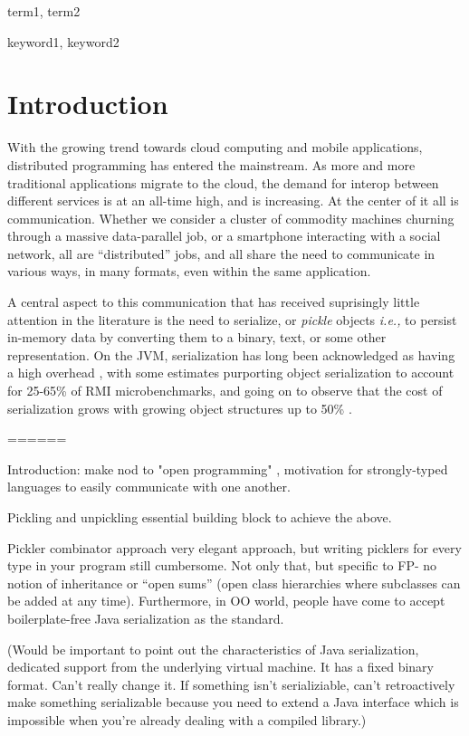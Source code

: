 \documentclass[preprint,10pt]{sigplanconf}
\begin{document}

\terms
term1, term2

\keywords
keyword1, keyword2

\section{Introduction}

With the growing trend towards cloud computing and mobile applications,
distributed programming has entered the mainstream. As more and more
traditional applications migrate to the cloud, the demand for interop between
different services is at an all-time high, and is increasing. At the center of
it all is communication. Whether we consider a cluster of commodity machines
churning through a massive data-parallel job, or a smartphone interacting with
a social network, all are ``distributed'' jobs, and all share the need to
communicate in various ways, in many formats, even within the same
application.

A central aspect to this communication that has received suprisingly little
attention in the literature is the need to serialize, or {\em pickle} objects
{\em i.e.,} to persist in-memory data by converting them to a binary, text, or
some other representation. On the JVM, serialization has long been
acknowledged as having a high overhead \cite{Welsh2000, Carpenter1999}, with
some estimates purporting object serialization to account for 25-65\% of RMI
microbenchmarks, and going on to observe that the cost of serialization grows
with growing object structures up to 50\% \cite{Philippsen2000, Maassen1999}.


======

Introduction: make nod to "open programming" \cite{Rossberg2007}, motivation for strongly-typed languages to easily communicate with one another.

Pickling and unpickling essential building block to achieve the above.

Pickler combinator approach \cite{Kennedy2004} very elegant approach, but writing picklers for every type in your program still cumbersome. Not only that, but specific to FP- no notion of inheritance or ``open sums'' (open class hierarchies where subclasses can be added at any time). Furthermore, in OO world, people have come to accept boilerplate-free Java serialization as the standard.

(Would be important to point out the characteristics of Java serialization, dedicated support from the underlying virtual machine. It has a fixed binary format. Can't really change it. If something isn't serializiable, can't retroactively make something serializable because you need to extend a Java interface which is impossible when you're already dealing with a compiled library.)
\end{document}
